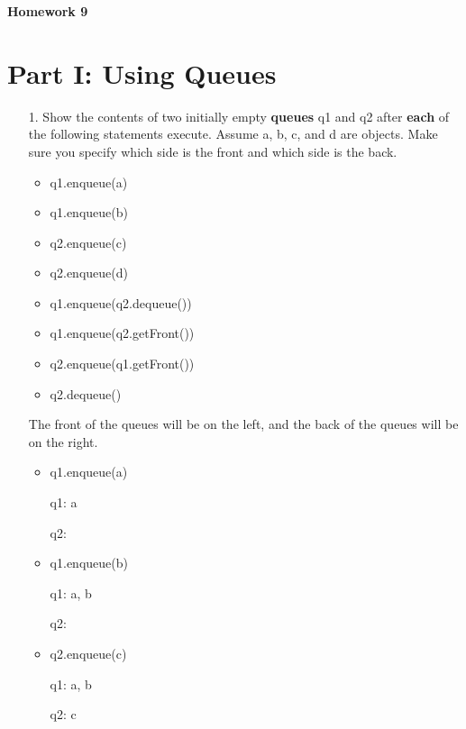 \documentclass[10pt]{article}
\begin{document}
\textbf{\large{Homework 9}}
	
\section{Part I: Using Queues}
	
	\begin{enumerate}
		\item[1.] Show the contents of two initially empty \textbf{queues} q1 and q2 after \textbf{each} of the following statements execute. Assume a, b, c, and d are objects. Make sure you specify which side is the front and which side is the back.
			
			\begin{itemize}
				\item q1.enqueue(a)
				
				\item q1.enqueue(b)
				
				\item q2.enqueue(c)
				
				\item q2.enqueue(d)
				
				\item q1.enqueue(q2.dequeue())
				
				\item q1.enqueue(q2.getFront())
				
				\item q2.enqueue(q1.getFront())
				
				\item q2.dequeue()
			\end{itemize}
			
			\vspace{0.5cm}
			The front of the queues will be on the left, and the back of the queues will be on the right.
			
			\begin{itemize}
				\item q1.enqueue(a)
					
					q1: a
					
					q2:
				
				\item q1.enqueue(b)
					
					q1: a, b
					
					q2:
				
				\item q2.enqueue(c)
					
					q1: a, b
					
					q2: c
				

\end{itemize}
\end{enumerate}
\end{document}
